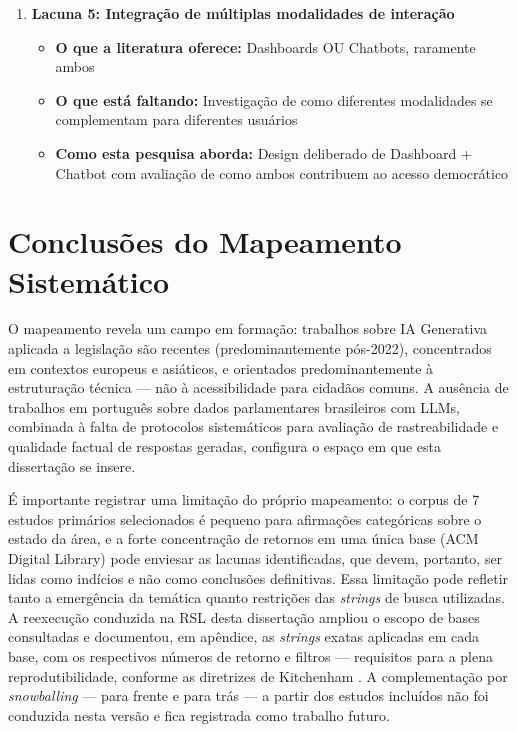 \begin{enumerate}
    \item \textbf{Lacuna 5: Integração de múltiplas modalidades de interação}
    \begin{itemize}
        \item \textbf{O que a literatura oferece:} Dashboards OU Chatbots, raramente ambos
        \item \textbf{O que está faltando:} Investigação de como diferentes modalidades se complementam para diferentes usuários
        \item \textbf{Como esta pesquisa aborda:} Design deliberado de Dashboard + Chatbot com avaliação de como ambos contribuem ao acesso democrático
    \end{itemize}
\end{enumerate}

\section{Conclusões do Mapeamento Sistemático}

O mapeamento revela um campo em formação: trabalhos sobre IA Generativa aplicada a legislação são recentes (predominantemente pós-2022), concentrados em contextos europeus e asiáticos, e orientados predominantemente à estruturação técnica — não à acessibilidade para cidadãos comuns. A ausência de trabalhos em português sobre dados parlamentares brasileiros com LLMs, combinada à falta de protocolos sistemáticos para avaliação de rastreabilidade e qualidade factual de respostas geradas, configura o espaço em que esta dissertação se insere.

É importante registrar uma limitação do próprio mapeamento: o corpus de 7 estudos primários selecionados é pequeno para afirmações categóricas sobre o estado da área, e a forte concentração de retornos em uma única base (ACM Digital Library) pode enviesar as lacunas identificadas, que devem, portanto, ser lidas como indícios e não como conclusões definitivas. Essa limitação pode refletir tanto a emergência da temática quanto restrições das \textit{strings} de busca utilizadas. A reexecução conduzida na RSL desta dissertação ampliou o escopo de bases consultadas e documentou, em apêndice, as \textit{strings} exatas aplicadas em cada base, com os respectivos números de retorno e filtros --- requisitos para a plena reprodutibilidade, conforme as diretrizes de Kitchenham \cite{Kitchenham2004}. A complementação por \textit{snowballing} --- para frente e para trás --- a partir dos estudos incluídos não foi conduzida nesta versão e fica registrada como trabalho futuro.
